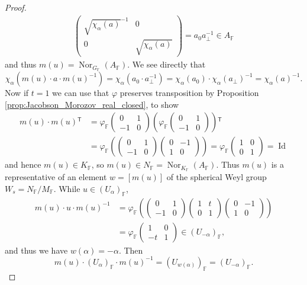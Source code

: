 \documentclass[12pt]{amsart}
\newcommand{\F}{\mathbb{F} }
\newcommand{\tran}{{^{\mathsf{T}}\!}}
\numberwithin{equation}{section}
\theoremstyle{remark} %
\begin{document}
\begin{proof}
\begin{align*}
\begin{pmatrix}
		\sqrt{\chi_\alpha(a)}^{-1} & 0 \\ 0 & \sqrt{\chi_\alpha(a)}
		\end{pmatrix} = a_0 a_\perp^{-1} \in A_\F
	\end{align*}
	and thus $m(u) = \operatorname{Nor}_{G_\F}(A_\F)$. We see directly that 
	$$
	\chi_\alpha (m(u) \cdot a\cdot m(u)^{-1}) = \chi_\alpha(a_0 \cdot a_\perp^{-1}) = \chi_\alpha(a_0) \cdot \chi_\alpha(a_\perp)^{-1} = \chi_\alpha(a)^{-1}.
	$$
	Now if $t=1$ we can use that $\varphi$ preserves transposition by Proposition \ref{prop:Jacobson_Morozov_real_closed}, to show
	\begin{align*}
		m(u) \cdot m(u)\tran &= \varphi_\F \begin{pmatrix}
			0 & 1 \\ -1 & 0
		\end{pmatrix} \left( \varphi_\F \begin{pmatrix}
			0 & 1 \\ -1 & 0
		\end{pmatrix}\right)\tran \\
		& = \varphi_\F \left( \begin{pmatrix}
			0 & 1 \\ -1 & 0
		\end{pmatrix}   \begin{pmatrix}
			0 & -1 \\ 1 & 0
		\end{pmatrix} \right)= \varphi_\F\begin{pmatrix}
			1 & 0 \\ 0 & 1
		\end{pmatrix} = \operatorname{Id}
	\end{align*}
	and hence $m(u)\in K_\F$, so $m(u) \in N_{\F} = \operatorname{Nor}_{K_\F}(A_\F)$. Thus $m(u)$ is a representative of an element $w=[m(u)]$ of the spherical Weyl group $W_s = N_\F/M_\F$. While $u\in (U_{\alpha})_\F$,
	\begin{align*}
		m(u)\cdot u\cdot m(u)^{-1} &= \varphi_\F \left( \begin{pmatrix}
			0 & 1 \\ -1 & 0
		\end{pmatrix}\begin{pmatrix}
			1 & t \\ 0 & 1
		\end{pmatrix} \begin{pmatrix}
			0 & -1 \\ 1 & 0
		\end{pmatrix} \right) \\
		&= \varphi_\F \begin{pmatrix}
			1 & 0 \\ -t & 1
		\end{pmatrix} \in (U_{-\alpha})_\F,
	\end{align*}
	and thus we have $w(\alpha) = -\alpha$. Then 
$$
m(u) \cdot (U_\alpha)_\F \cdot  m(u)^{-1} = (U_{w(\alpha)})_\F =  (U_{-\alpha})_\F.
$$
\end{proof}
\end{document}
